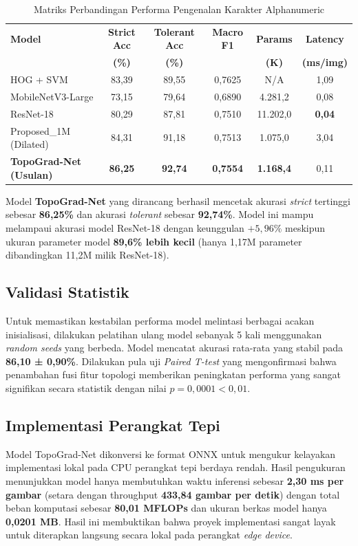 \documentclass[12pt,a4paper]{article}
\begin{document}
\begin{table}[htbp]
\centering
\caption{Matriks Perbandingan Performa Pengenalan Karakter Alphanumeric}
\label{tab:laporan_performa}
\begin{tabular}{lccccc}
\toprule
\textbf{Model} & \textbf{Strict Acc} & \textbf{Tolerant Acc} & \textbf{Macro F1} & \textbf{Params} & \textbf{Latency} \\
& \textbf{(\%)} & \textbf{(\%)} & & \textbf{(K)} & \textbf{(ms/img)} \\
\midrule
HOG + SVM & 83,39 & 89,55 & 0,7625 & N/A & 1,09 \\
MobileNetV3-Large & 73,15 & 79,64 & 0,6890 & 4.281,2 & 0,08 \\
ResNet-18 & 80,29 & 87,81 & 0,7510 & 11.202,0 & \textbf{0,04} \\
Proposed\_1M (Dilated) & 84,31 & 91,18 & 0,7513 & 1.075,0 & 3,04 \\
\textbf{TopoGrad-Net (Usulan)} & \textbf{86,25} & \textbf{92,74} & \textbf{0,7554} & \textbf{1.168,4} & 0,11 \\
\bottomrule
\end{tabular}
\end{table}

Model \textbf{TopoGrad-Net} yang dirancang berhasil mencetak akurasi \textit{strict} tertinggi sebesar \textbf{86,25\%} dan akurasi \textit{tolerant} sebesar \textbf{92,74\%}. Model ini mampu melampaui akurasi model ResNet-18 dengan keunggulan $+5,96\%$ meskipun ukuran parameter model \textbf{89,6\% lebih kecil} (hanya 1,17M parameter dibandingkan 11,2M milik ResNet-18).

\subsection*{Validasi Statistik}
Untuk memastikan kestabilan performa model melintasi berbagai acakan inisialisasi, dilakukan pelatihan ulang model sebanyak 5 kali menggunakan \textit{random seeds} yang berbeda. Model mencatat akurasi rata-rata yang stabil pada \textbf{86,10 ± 0,90\%}. Dilakukan pula uji \textit{Paired T-test} yang mengonfirmasi bahwa penambahan fusi fitur topologi memberikan peningkatan performa yang sangat signifikan secara statistik dengan nilai $p = 0,0001 < 0,01$.

\subsection*{Implementasi Perangkat Tepi}
Model TopoGrad-Net dikonversi ke format ONNX untuk mengukur kelayakan implementasi lokal pada CPU perangkat tepi berdaya rendah. Hasil pengukuran menunjukkan model hanya membutuhkan waktu inferensi sebesar \textbf{2,30 ms per gambar} (setara dengan throughput \textbf{433,84 gambar per detik}) dengan total beban komputasi sebesar \textbf{80,01 MFLOPs} dan ukuran berkas model hanya \textbf{0,0201 MB}. Hasil ini membuktikan bahwa proyek implementasi sangat layak untuk diterapkan langsung secara lokal pada perangkat \textit{edge device}.
\end{document}
